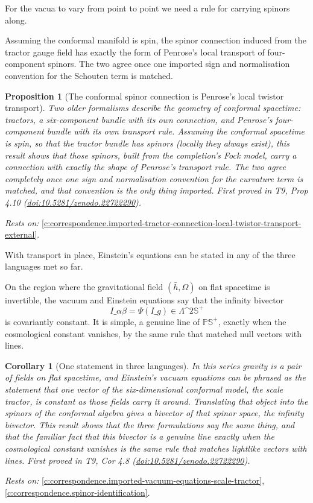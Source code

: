 \documentclass[11pt]{article}
\newtheorem{proposition}[theorem]{Proposition}
\newtheorem{corollary}[theorem]{Corollary}
\theoremstyle{definition}
\theoremstyle{plain}
\providecommand{\CS}{}\renewcommand{\CS}{{\mathbb{S}^{+}}}
\providecommand{\PCS}{}\renewcommand{\PCS}{\mathbb{P}{\mathbb{S}^{+}}}
\providecommand{\hb}{}\renewcommand{\hb}{\bar{h}}
\begin{document}
For the vacua to vary from point to point we need a rule for carrying spinors along.

Assuming the conformal manifold is spin, the spinor connection induced from the tractor gauge field has exactly the form of Penrose's local transport of four-component spinors. The two agree once one imported sign and normalisation convention for the Schouten term is matched.

\begin{proposition}[The conformal spinor connection is Penrose's local twistor transport]\label{c:correspondence.local-twistor-transport-ascended-spinor-connection}
Two older formalisms describe the geometry of conformal spacetime: tractors, a six-component bundle with its own connection, and Penrose's four-component bundle with its own transport rule. Assuming the conformal spacetime is spin, so that the tractor bundle has spinors (locally they always exist), this result shows that those spinors, built from the completion's Fock model, carry a connection with exactly the shape of Penrose's transport rule. The two agree completely once one sign and normalisation convention for the curvature term is matched, and that convention is the only thing imported.
\emph{First proved in} T9, Prop 4.10 (\href{https://doi.org/10.5281/zenodo.22722290}{doi:10.5281/zenodo.22722290}).
\end{proposition}
\noindent\emph{Rests on:} \ref{c:correspondence.imported-tractor-connection-local-twistor-transport-external}.

With transport in place, Einstein's equations can be stated in any of the three languages met so far.

On the region where the gravitational field $(\hb, \Omega)$ on flat spacetime is invertible, the vacuum and Einstein equations say that the infinity bivector \[ I\_{\alpha\beta} = \Psi(I\_g) \in \Lambda\^{}{2}\CS \] is covariantly constant. It is simple, a genuine line of $\PCS$, exactly when the cosmological constant vanishes, by the same rule that matched null vectors with lines.

\begin{corollary}[One statement in three languages]\label{c:correspondence.one-statement-three-languages}
In this series gravity is a pair of fields on flat spacetime, and Einstein's vacuum equations can be phrased as the statement that one vector of the six-dimensional conformal model, the scale tractor, is constant as those fields carry it around. Translating that object into the spinors of the conformal algebra gives a bivector of that spinor space, the infinity bivector. This result shows that the three formulations say the same thing, and that the familiar fact that this bivector is a genuine line exactly when the cosmological constant vanishes is the same rule that matches lightlike vectors with lines.
\emph{First proved in} T9, Cor 4.8 (\href{https://doi.org/10.5281/zenodo.22722290}{doi:10.5281/zenodo.22722290}).
\end{corollary}
\noindent\emph{Rests on:} \ref{c:correspondence.imported-vacuum-equations-scale-tractor}, \ref{c:correspondence.spinor-identification}.
\end{document}
